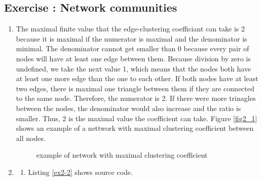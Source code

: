 \documentclass[10pt,a4paper]{article}
\newcommand{\exercise}[1]
{
  \stepcounter{subsection}
  \subsection*{Exercise \thesubsection: #1}

}
\begin{document}
\exercise{Network communities}
\begin{enumerate}
\item The maximal finite value that the edge-clustering coefficiant can take is 2 because it is maximal if the numerator is maximal and the denominator is minimal. The denominator cannot get smaller than 0 because every pair of nodes will have at least one edge between them. Because division by zero is undefined, we take the next value 1, which means that the nodes both have at least one more edge than the one to each other. If both nodes have at least two edges, there is maximal one triangle between them if they are connected to the same node. Therefore, the numerator is 2. If there were more trinagles between the nodes, the denominator would also increase and the ratio is smaller. Thus, 2 is the maximal value the coefficient can take. Figure \ref{fig2_1} shows an example of a nettwork with maximal clustering coefficient between all nodes.\\
\newline
\begin{figure}
\begin{center}
\caption{example of network with maximal clustering coefficient}
\end{center}
\end{figure}

\item
\begin{enumerate}
\item Listing \ref{ex2-2} shows source code.


\end{enumerate}
\end{enumerate}
\end{document}
